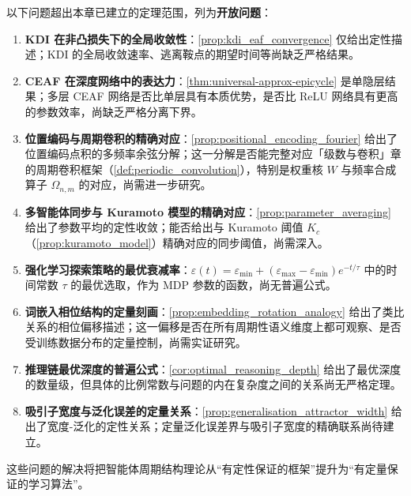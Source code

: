 \begin{remark}[开放问题]\label{rem:agent_open_problems}
以下问题超出本章已建立的定理范围，列为\textbf{开放问题}：
\begin{enumerate}[label=(\roman*)]
    \item \textbf{KDI 在非凸损失下的全局收敛性}：\cref{prop:kdi_eaf_convergence} 仅给出定性描述；KDI 的全局收敛速率、逃离鞍点的期望时间等尚缺乏严格结果。
    \item \textbf{CEAF 在深度网络中的表达力}：\cref{thm:universal-approx-epicycle} 是单隐层结果；多层 CEAF 网络是否比单层具有本质优势，是否比 ReLU 网络具有更高的参数效率，尚缺乏严格分离下界。
    \item \textbf{位置编码与周期卷积的精确对应}：\cref{prop:positional_encoding_fourier} 给出了位置编码点积的多频率余弦分解；这一分解是否能完整对应「级数与卷积」章的周期卷积框架（\cref{def:periodic_convolution}），特别是权重核 $W$ 与频率合成算子 $\Omega_{n,m}$ 的对应，尚需进一步研究。
    \item \textbf{多智能体同步与 Kuramoto 模型的精确对应}：\cref{prop:parameter_averaging} 给出了参数平均的定性收敛；能否给出与 Kuramoto 阈值 $K_c$（\cref{prop:kuramoto_model}）精确对应的同步阈值，尚需深入。
    \item \textbf{强化学习探索策略的最优衰减率}：$\varepsilon(t) = \varepsilon_{\min} + (\varepsilon_{\max} - \varepsilon_{\min}) e^{-t/\tau}$ 中的时间常数 $\tau$ 的最优选取，作为 MDP 参数的函数，尚无普遍公式。
    \item \textbf{词嵌入相位结构的定量刻画}：\cref{prop:embedding_rotation_analogy} 给出了类比关系的相位偏移描述；这一偏移是否在所有周期性语义维度上都可观察、是否受训练数据分布的定量控制，尚需实证研究。
    \item \textbf{推理链最优深度的普遍公式}：\cref{cor:optimal_reasoning_depth} 给出了最优深度的数量级，但具体的比例常数与问题的内在复杂度之间的关系尚无严格定理。
    \item \textbf{吸引子宽度与泛化误差的定量关系}：\cref{prop:generalisation_attractor_width} 给出了宽度-泛化的定性关系；定量泛化误差界与吸引子宽度的精确联系尚待建立。
\end{enumerate}
这些问题的解决将把智能体周期结构理论从“有定性保证的框架”提升为“有定量保证的学习算法”。
\end{remark}

